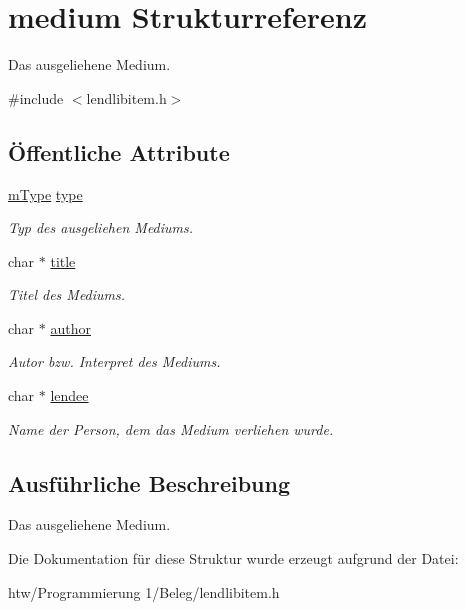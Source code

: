 \hypertarget{structmedium}{}\section{medium Strukturreferenz}
\label{structmedium}


Das ausgeliehene Medium.  




{\ttfamily \#include $<$lendlibitem.\+h$>$}

\subsection*{Öffentliche Attribute}
\begin{DoxyCompactItemize}
\item 
\hyperlink{group___lend_lib_item_ga636cfca014f3212ea82d45e28f9cb51b}{m\+Type} \hyperlink{structmedium_a863e13a6ba17d36f94c1a79acef3c0b6}{type}\hypertarget{structmedium_a863e13a6ba17d36f94c1a79acef3c0b6}{}\label{structmedium_a863e13a6ba17d36f94c1a79acef3c0b6}

\begin{DoxyCompactList}\small\item\em Typ des ausgeliehen Mediums. \end{DoxyCompactList}\item 
char $\ast$ \hyperlink{structmedium_aa4672c0637ae3b8e5afe086ab4dd2180}{title}\hypertarget{structmedium_aa4672c0637ae3b8e5afe086ab4dd2180}{}\label{structmedium_aa4672c0637ae3b8e5afe086ab4dd2180}

\begin{DoxyCompactList}\small\item\em Titel des Mediums. \end{DoxyCompactList}\item 
char $\ast$ \hyperlink{structmedium_a35c25790a53f2ba0a5fbdb333ebb8bca}{author}\hypertarget{structmedium_a35c25790a53f2ba0a5fbdb333ebb8bca}{}\label{structmedium_a35c25790a53f2ba0a5fbdb333ebb8bca}

\begin{DoxyCompactList}\small\item\em Autor bzw. Interpret des Mediums. \end{DoxyCompactList}\item 
char $\ast$ \hyperlink{structmedium_a4b535b8356bd22f22ffca4f6424bb9cb}{lendee}\hypertarget{structmedium_a4b535b8356bd22f22ffca4f6424bb9cb}{}\label{structmedium_a4b535b8356bd22f22ffca4f6424bb9cb}

\begin{DoxyCompactList}\small\item\em Name der Person, dem das Medium verliehen wurde. \end{DoxyCompactList}\end{DoxyCompactItemize}


\subsection{Ausführliche Beschreibung}
Das ausgeliehene Medium. 

Die Dokumentation für diese Struktur wurde erzeugt aufgrund der Datei\+:\begin{DoxyCompactItemize}
\item 
htw/\+Programmierung 1/\+Beleg/lendlibitem.\+h\end{DoxyCompactItemize}
